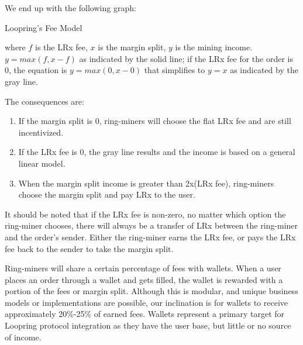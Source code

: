 \documentclass[UTF8,nofonts]{article}
\makeatletter
\newenvironment{figurehere}
 {\def\@captype{figure}}
 {}
\makeatother
\begin{document}
\begin{multicols}{2}
\begin{enumerate}
We end up with the following graph:

\begin{center}
\begin{figurehere}
\centering
{}
\caption{Loopring's Fee Model}
\label{fig:feemodel}
\end{figurehere}
\end{center}


where $f$ is the LRx fee, $x$ is the margin split, $y$ is the mining income. $y=max(f, x-f)$ as indicated by the solid line; if the LRx fee for the order is $0$, the equation is $y=max(0, x - 0)$ that simplifies to $y=x$ as indicated by the gray line.


The consequences are:  
\begin{enumerate}
	\item If the margin split is 0, ring-miners will choose the flat LRx fee and are still incentivized. 
	\item If the LRx fee is 0, the gray line results and the income is based on a general linear model.
	\item When the margin split income is greater than 2x(LRx fee), ring-miners choose the margin split and pay LRx to the user.
\end{enumerate}

It should be noted that if the LRx fee is non-zero, no matter which option the ring-miner chooses, there will always be a transfer of LRx between the ring-miner and the order's sender. Either the ring-miner earns the LRx fee, or pays the LRx fee back to the sender to take the margin split.

Ring-miners will share a certain percentage of fees with wallets. When a user places an order through a wallet and gets filled, the wallet is rewarded with a portion of the fees or margin split. Although this is modular, and unique business models or implementations are possible, our inclination is for wallets to receive approximately 20\%-25\% of earned fees. Wallets represent a primary target for Loopring protocol integration as they have the user base, but little or no source of income.


\end{enumerate}
\end{multicols}
\end{document}

